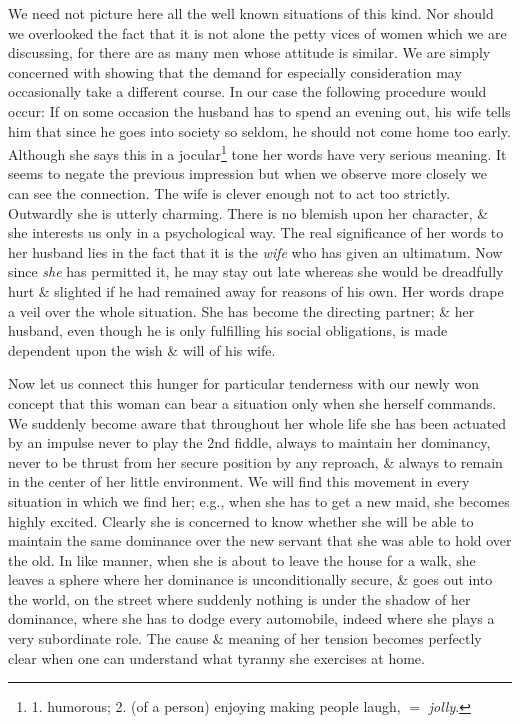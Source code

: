 \documentclass{article}
\begin{document}
We need not picture here all the well known situations of this kind. Nor should we overlooked the fact that it is not alone the petty vices of women which we are discussing, for there are as many men whose attitude is similar. We are simply concerned with showing that the demand for especially consideration may occasionally take a different course. In our case the following procedure would occur: If on some occasion the husband has to spend an evening out, his wife tells him that since he goes into society so seldom, he should not come home too early. Although she says this in a jocular\footnote{1. humorous; 2. (of a person) enjoying making people laugh, $=$ {\it jolly}.} tone her words have very serious meaning. It seems to negate the previous impression but when we observe more closely we can see the connection. The wife is clever enough not to act too strictly. Outwardly she is utterly charming. There is no blemish upon her character, \& she interests us only in a psychological way. The real significance of her words to her husband lies in the fact that it is the {\it wife} who has given an ultimatum. Now since {\it she} has permitted it, he may stay out late whereas she would be dreadfully hurt \& slighted if he had remained away for reasons of his own. Her words drape a veil over the whole situation. She has become the directing partner; \& her husband, even though he is only fulfilling his social obligations, is made dependent upon the wish \& will of his wife.

Now let us connect this hunger for particular tenderness with our newly won concept that this woman can bear a situation only when she herself commands. We suddenly become aware that throughout her whole life she has been actuated by an impulse never to play the 2nd fiddle, always to maintain her dominancy, never to be thrust from her secure position by any reproach, \& always to remain in the center of her little environment. We will find this movement in every situation in which we find her; e.g., when she has to get a new maid, she becomes highly excited. Clearly she is concerned to know whether she will be able to maintain the same dominance over the new servant that she was able to hold over the old. In like manner, when she is about to leave the house for a walk, she leaves a sphere where her dominance is unconditionally secure, \& goes out into the world, on the street where suddenly nothing is under the shadow of her dominance, where she has to dodge every automobile, indeed where she plays a very subordinate role. The cause \& meaning of her tension becomes perfectly clear when one can understand what tyranny she exercises at home.
\end{document}
